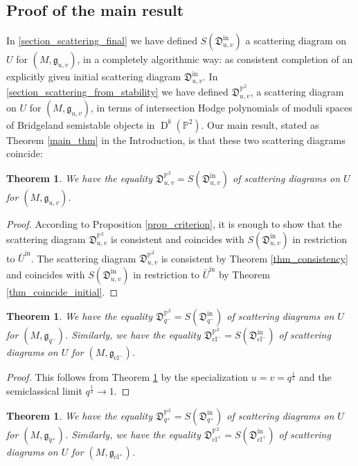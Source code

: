 \documentclass[12pt, a4paper]{amsart}
\newtheorem{thm}[defn]{Theorem}
\newcommand\PP{\mathbb P}
\newcommand\fD{\mathfrak D}
\newcommand\fg{\mathfrak g}
\newcommand\cl{\operatorname{cl}}
\newcommand\D{\operatorname{D}}
\newcommand\iin{\mathrm{in}}
\begin{document}
\subsection{Proof of the main result}
\label{subsection_main_result}
In \cref{section_scattering_final} we have defined $S(\fD^\iin_{u,v})$ a scattering diagram 
on $U$ for $(M, \fg_{u,v})$, in a completely algorithmic way: as consistent completion of an explicitly given initial scattering diagram $\fD^\iin_{u,v}$.
In \cref{section_scattering_from_stability} we have defined 
$\fD_{u,v}^{\PP^2}$, a scattering diagram on $U$ for 
$(M, \fg_{u,v})$, in terms of intersection Hodge polynomials 
of moduli spaces of Bridgeland semistable objects in $\D^b(\PP^2)$.
Our main result, stated as Theorem
\ref{main_thm} in the Introduction, is that these two scattering diagrams coincide:

\begin{thm}\label{thm_main_precise}
We have the equality
$\fD^{\PP^2}_{u,v}=S(\fD^\iin_{u,v})$
of scattering diagrams on $U$ for 
$(M, \fg_{u,v})$.
\end{thm}

\begin{proof}
According to Proposition \ref{prop_criterion}, it is enough to show that the scattering diagram $\fD^{\PP^2}_{u,v}$ is consistent and coincides with 
$S(\fD^\iin_{u,v})$ in restriction to 
$\bar{U}^\iin$. 
The scattering diagram 
$\fD_{u,v}^{\PP^2}$ is consistent by Theorem 
\ref{thm_consistency}
and coincides with $S(\fD^\iin_{u,v})$ in 
restriction to 
$\bar{U}^\iin$ by Theorem \ref{thm_coincide_initial}. 
\end{proof}

\begin{thm}\label{thm_main_precise_limit}
We have the equality 
$\fD_{q^-}^{\PP^2}=S(\fD^\iin_{q^-})$
of scattering diagrams on $U$ for 
$(M,\fg_{q^-})$.
Similarly, we have the equality
$\fD_{\cl^-}^{\PP^2}=S(\fD^\iin_{\cl^-})$
of scattering diagrams on $U$ for 
$(M,\fg_{\cl^-})$.
\end{thm}

\begin{proof}
This follows from Theorem \ref{thm_main_precise} by the specialization $u=v=q^{\frac{1}{2}}$ and the semiclassical limit $q^{\frac{1}{2}}
\rightarrow 1$.
\end{proof}

\begin{thm}\label{thm_main_precise_sign}
We have the equality 
$\fD_{q^+}^{\PP^2}=S(\fD^\iin_{q^+})$
of scattering diagrams on $U$ for 
$(M,\fg_{q^+})$.
Similarly, we have the equality
$\fD_{\cl^+}^{\PP^2}=S(\fD^\iin_{\cl^+})$
of scattering diagrams on $U$ for 
$(M,\fg_{\cl^+})$.
\end{thm}
\end{document}
